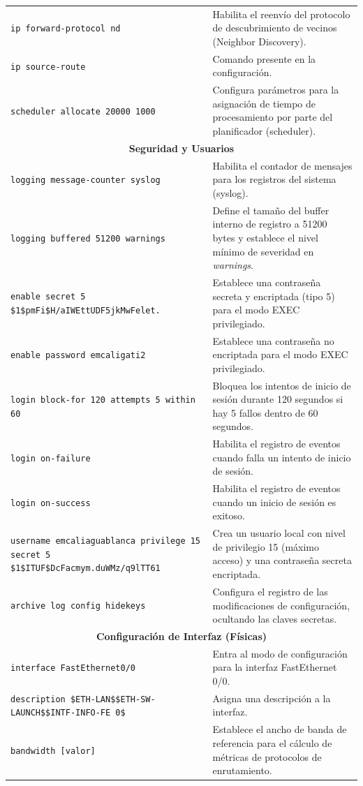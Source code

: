 \documentclass[a5paper]{book}%
\begin{document}
\begin{longtable}{|p{6cm}|p{4cm}|}
\texttt{ip forward-protocol nd} & Habilita el reenvío del protocolo de descubrimiento de vecinos (Neighbor Discovery). \\
\texttt{ip source-route} & Comando presente en la configuración. \\
\texttt{scheduler allocate 20000 1000} & Configura parámetros para la asignación de tiempo de procesamiento por parte del planificador (scheduler). \\
\multicolumn{2}{|c|}{\textbf{Seguridad y Usuarios}}\\\hline
\texttt{logging message-counter syslog} & Habilita el contador de mensajes para los registros del sistema (syslog). \\
\texttt{logging buffered 51200 warnings} & Define el tamaño del buffer interno de registro a 51200 bytes y establece el nivel mínimo de severidad en \textit{warnings}. \\
\texttt{enable secret 5 \$1\$pmFi\$H/aIWEttUDF5jkMwFelet.} & Establece una contraseña secreta y encriptada (tipo 5) para el modo EXEC privilegiado. \\
\texttt{enable password emcaligati2} & Establece una contraseña no encriptada para el modo EXEC privilegiado. \\
\texttt{login block-for 120 attempts 5 within 60} & Bloquea los intentos de inicio de sesión durante 120 segundos si hay 5 fallos dentro de 60 segundos. \\
\texttt{login on-failure} & Habilita el registro de eventos cuando falla un intento de inicio de sesión. \\
\texttt{login on-success} & Habilita el registro de eventos cuando un inicio de sesión es exitoso. \\
\texttt{username emcaliaguablanca privilege 15 secret 5 \$1\$ITUF\$DcFacmym.duWMz/q9lTT61} & Crea un usuario local con nivel de privilegio 15 (máximo acceso) y una contraseña secreta encriptada. \\
\texttt{archive log config hidekeys} & Configura el registro de las modificaciones de configuración, ocultando las claves secretas. \\
\multicolumn{2}{|c|}{\textbf{Configuración de Interfaz (Físicas)}}\\\hline
\texttt{interface FastEthernet0/0} & Entra al modo de configuración para la interfaz FastEthernet 0/0. \\
\texttt{description \$ETH-LAN\$\$ETH-SW-LAUNCH\$\$INTF-INFO-FE 0\$} & Asigna una descripción a la interfaz. \\
\texttt{bandwidth [valor]} & Establece el ancho de banda de referencia para el cálculo de métricas de protocolos de enrutamiento. \\

\end{longtable}
\end{document}
